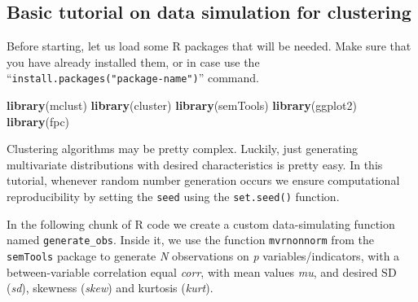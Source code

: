\documentclass[
  man,floatsintext]{apa6}
\newenvironment{Shaded}{\begin{snugshade}}{\end{snugshade}}
\newcommand{\FunctionTok}[1]{\textcolor[rgb]{0.13,0.29,0.53}{\textbf{#1}}}
\newcommand{\NormalTok}[1]{#1}
\begin{document}
\hypertarget{basic-tutorial-on-data-simulation-for-clustering}{%
\subsection{Basic tutorial on data simulation for clustering}\label{basic-tutorial-on-data-simulation-for-clustering}}

Before starting, let us load some R packages that will be needed. Make sure that you have already installed them, or in case use the ``\texttt{install.packages("package-name")}'' command.

\begin{Shaded}
\begin{Highlighting}[]
\FunctionTok{library}\NormalTok{(mclust)}
\FunctionTok{library}\NormalTok{(cluster)}
\FunctionTok{library}\NormalTok{(semTools)}
\FunctionTok{library}\NormalTok{(ggplot2)}
\FunctionTok{library}\NormalTok{(fpc)}
\end{Highlighting}
\end{Shaded}

Clustering algorithms may be pretty complex. Luckily, just generating multivariate distributions with desired characteristics is pretty easy. In this tutorial, whenever random number generation occurs we ensure computational reproducibility by setting the \texttt{seed} using the \texttt{set.seed()} function.

In the following chunk of R code we create a custom data-simulating function named \texttt{generate\_obs}. Inside it, we use the function \texttt{mvrnonnorm} from the \texttt{semTools} package to generate \emph{N} observations on \emph{p} variables/indicators, with a between-variable correlation equal \emph{corr}, with mean values \emph{mu}, and desired SD (\emph{sd}), skewness (\emph{skew}) and kurtosis (\emph{kurt}).
\end{document}
